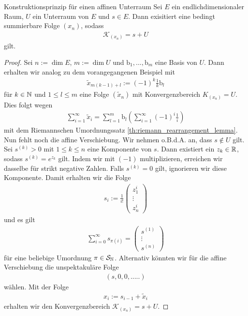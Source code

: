 \begin{genericthm}{Konstruktionsprinzip für einen affinen Unterraum}
	Sei $  E $ ein endlichdimensionaler Raum, $ U $ ein Unterraum von $ E $ und $ s \in E $.
	Dann exisitiert eine bedingt summierbare Folge $ (x_n) $, sodass
	\begin{align*}
		\mathcal{K}_{(x_n)}
		= 
		s + U
	\end{align*}
	gilt. 
\end{genericthm}

\begin{proof}
	Sei $ n := \dim E $, $ m := \dim U $ und $ \mathrm{b}_1,...,\mathrm{b}_m $ eine Basis von $ U $.
	Dann erhalten wir analog zu dem vorangegangenen Beispiel mit
	\begin{align*}
		\tilde{x}_{m(k-1) + l }
		:=
		(-1)^k \frac{1}{k} \mathrm{b}_l
	\end{align*}
	für $ k \in \mathbb{N} $ und $ 1 \leq l \leq m $ eine Folge $ (\tilde{x}_n) $ mit Konvergenzbereich $ K_{(x_n)} = U $.
	Dies folgt wegen
	\begin{align*}
		\sum \limits_{i=1}^\infty \tilde{x}_i
		=
		\sum \limits_{l=1}^m  \mathrm{b}_l \left(\sum \limits_{i = 1}^\infty (-1)^i \frac{1}{i} \right)
	\end{align*}
	mit dem Riemannschen Umordnungssatz \ref{th:riemann_rearrangement_lemma}.
	Nun fehlt noch die affine Verschiebung. 
	Wir nehmen o.B.d.A. an, dass $ s \notin U $ gilt.
	Sei $ s^{(k)} > 0 $ mit $ 1 \leq k \leq n $ eine Komponente von $ s $. 
	Dann existiert ein $ z_k \in \mathbb{R} $, sodass $ s^{(k)} =e^{z_k} $ gilt.
	Indem wir mit $ (-1) $ multiplizieren, erreichen wir dasselbe für strikt negative Zahlen. 
	Falls $ s^{(k)}  = 0$ gilt, ignorieren wir diese Komponente.
 	Damit erhalten wir die Folge
	\begin{align*}
		s_{i}:=
		\frac{1}{i!}
		\begin{pmatrix}
			z_1^i\\
			\vdots\\
			z_n^i
		\end{pmatrix}
	\end{align*}
	und es gilt
	\begin{align*}
		\sum \limits_{i=0}^\infty
		s_{\pi(i)}
		=
		\begin{pmatrix}
			s^{(1)}\\
			\vdots\\
			s^{(n)}
		\end{pmatrix}
	\end{align*}
	für eine beliebige Umordnung $ \pi \in \mathcal{S}_{\mathbb{N}} $.
	Alternativ könnten wir für die affine Verschiebung die unspektakuläre Folge
	\begin{align*}
		(s,0,0,.....)
	\end{align*}
	wählen.
	Mit der Folge 
	\begin{align*}
		x_i := s_{i-1} + \tilde{x}_i
	\end{align*}
	erhalten wir den Konvergenzbereich $ \mathcal{K}_{(x_n)} = s + U $.
\end{proof}


